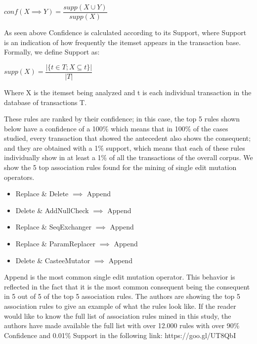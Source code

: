 \documentclass[conference]{IEEEtran}
\begin{document}
\begin{center}
$conf(X \implies Y) = \dfrac{supp(X \cup Y)}{supp(X)}$ 
\end{center}

As seen above Confidence is calculated according to its Support, where Support is an indication of how frequently the itemset appears in the transaction base.
Formally, we define Support as:

\begin{center}
$supp(X) = \dfrac{|\{t \in T; X \subseteq t\}|}{|T|}$
\end{center}

Where X is the itemset being analyzed and t is each individual transaction in the database of transactions T. 

These rules are ranked by their confidence; in this case, the top 5 rules shown below have a confidence of a 100\% which means that in 100\% of the cases studied, every transaction that showed the antecedent also shows the consequent; and they are obtained with a 1\% support, which means that each of these rules individually show in at least a 1\% of all the transactions of the overall corpus. We show the 5  top association rules found for the mining of single edit mutation operators.


\begin{itemize}
\item Replace \& Delete $\implies$ Append
\item Delete \& AddNullCheck $\implies$ Append
\item Replace \& SeqExchanger $\implies$ Append
\item Replace \& ParamReplacer $\implies$ Append
\item Delete \& CasteeMutator $\implies$ Append
\end{itemize}

Append is the most common single edit mutation operator. This behavior is reflected in the fact that it is the most common consequent being the consequent in 5 out of 5 of the top 5 association rules. The authors are showing the top 5 association rules to give an example of what the rules look like. If the reader would like to know the full list of association rules mined in this study, the authors have made available the full list with over 12.000 rules with over 90\% Confidence and 0.01\% Support in the following link: https://goo.gl/UT8QbI
\end{document}
